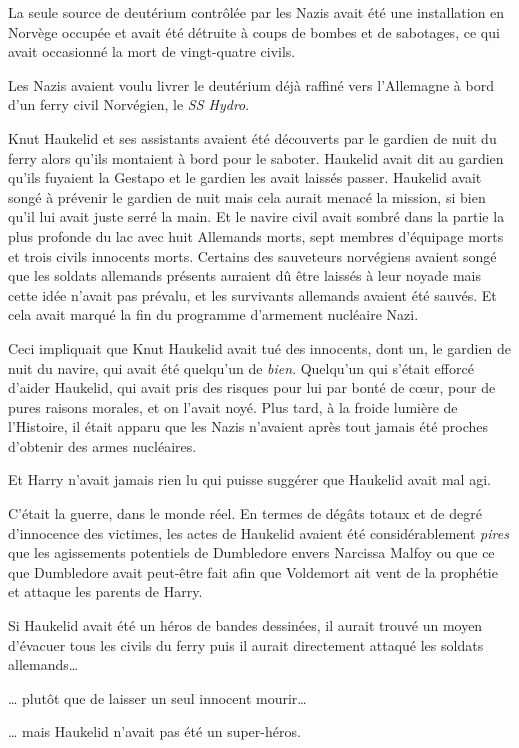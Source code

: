 La seule source de deutérium contrôlée par les Nazis avait été une installation en Norvège occupée et avait été détruite à coups de bombes et de sabotages, ce qui avait occasionné la mort de vingt-quatre civils.

Les Nazis avaient voulu livrer le deutérium déjà raffiné vers l'Allemagne à bord d'un ferry civil Norvégien, le \emph{SS Hydro}.

Knut Haukelid et ses assistants avaient été découverts par le gardien de nuit du ferry alors qu'ils montaient à bord pour le saboter.
Haukelid avait dit au gardien qu'ils fuyaient la Gestapo et le gardien les avait laissés passer.
Haukelid avait songé à prévenir le gardien de nuit mais cela aurait menacé la mission, si bien qu'il lui avait juste serré la main.
Et le navire civil avait sombré dans la partie la plus profonde du lac avec huit Allemands morts, sept membres d'équipage morts et trois civils innocents morts.
Certains des sauveteurs norvégiens avaient songé que les soldats allemands présents auraient dû être laissés à leur noyade mais cette idée n'avait pas prévalu, et les survivants allemands avaient été sauvés.
Et cela avait marqué la fin du programme d'armement nucléaire Nazi.

Ceci impliquait que Knut Haukelid avait tué des innocents, dont un, le gardien de nuit du navire, qui avait été quelqu'un de \emph{bien}.
Quelqu'un qui s'était efforcé d'aider Haukelid, qui avait pris des risques pour lui par bonté de cœur, pour de pures raisons morales, et on l'avait noyé.
Plus tard, à la froide lumière de l'Histoire, il était apparu que les Nazis n'avaient après tout jamais été proches d'obtenir des armes nucléaires.

Et Harry n'avait jamais rien lu qui puisse suggérer que Haukelid avait mal agi.

C'était la guerre, dans le monde réel.
En termes de dégâts totaux et de degré d'innocence des victimes, les actes de Haukelid avaient été considérablement \emph{pires} que les agissements potentiels de Dumbledore envers Narcissa Malfoy ou que ce que Dumbledore avait peut-être fait afin que Voldemort ait vent de la prophétie et attaque les parents de Harry.

Si Haukelid avait été un héros de bandes dessinées, il aurait trouvé un moyen d'évacuer tous les civils du ferry puis il aurait directement attaqué les soldats allemands…

… plutôt que de laisser un seul innocent mourir…

… mais Haukelid n'avait pas été un super-héros.

